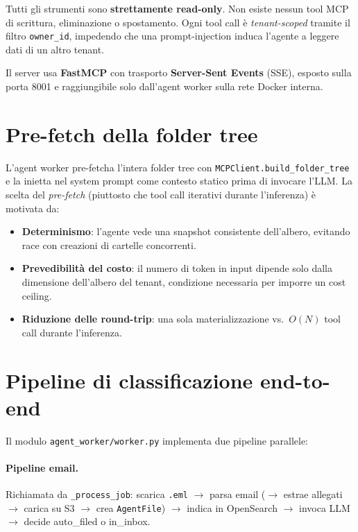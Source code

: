 Tutti gli strumenti sono \textbf{strettamente read-only}. Non esiste nessun tool MCP
di scrittura, eliminazione o spostamento. Ogni tool call \`e \emph{tenant-scoped}
tramite il filtro \texttt{owner\_id}, impedendo che una prompt-injection induca
l'agente a leggere dati di un altro tenant.

Il server usa \textbf{FastMCP} con trasporto \textbf{Server-Sent Events} (SSE),
esposto sulla porta 8001 e raggiungibile solo dall'agent worker sulla rete Docker interna.

\section{Pre-fetch della folder tree}
\label{sec:prefetch}

L'agent worker pre-fetcha l'intera folder tree con \texttt{MCPClient.build\_folder\_tree}
e la inietta nel system prompt come contesto statico prima di invocare l'LLM. La scelta
del \emph{pre-fetch} (piuttosto che tool call iterativi durante l'inferenza) \`e motivata
da:

\begin{itemize}[leftmargin=*]
    \item \textbf{Determinismo}: l'agente vede una snapshot consistente dell'albero,
          evitando race con creazioni di cartelle concorrenti.
    \item \textbf{Prevedibilit\`a del costo}: il numero di token in input dipende solo
          dalla dimensione dell'albero del tenant, condizione necessaria per imporre
          un cost ceiling.
    \item \textbf{Riduzione delle round-trip}: una sola materializzazione vs.\
          $O(N)$ tool call durante l'inferenza.
\end{itemize}

\section{Pipeline di classificazione end-to-end}
\label{sec:pipeline}

Il modulo \texttt{agent\_worker/worker.py} implementa due pipeline parallele:

\paragraph{Pipeline email.}
Richiamata da \texttt{\_process\_job}: scarica \texttt{.eml} $\rightarrow$ parsa
email ($\rightarrow$ estrae allegati $\rightarrow$ carica su S3 $\rightarrow$ crea
\texttt{AgentFile}) $\rightarrow$ indica in OpenSearch $\rightarrow$ invoca LLM
$\rightarrow$ decide auto\_filed o in\_inbox.

